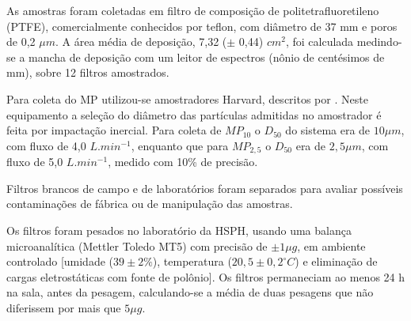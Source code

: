 As amostras foram coletadas em filtro de composição de politetrafluoretileno
(PTFE), comercialmente conhecidos por teflon, com diâmetro de 37 mm e 
poros de 0,2 $\mu m$. A área média de deposição, 7,32 ($\pm$ 0,44) $cm^2$, 
foi calculada medindo-se a mancha de deposição com um leitor de espectros 
(nônio de centésimos de mm), sobre 12 filtros amostrados.

Para coleta do MP utilizou-se amostradores Harvard, descritos por 
\citet{marple1987}. Neste equipamento a seleção do diâmetro das partículas 
admitidas no amostrador é feita por impactação inercial. 
Para coleta de $MP_{10}$ o $D_{50}$ do sistema era de $10 \mu m$, 
com fluxo de 4,0 $L.min^{-1}$, enquanto que para $MP_{2,5}$ o $D_{50}$ 
era de $2,5 \mu m$, com fluxo de 5,0 $L.min^{-1}$, medido com 10\% de precisão. 

Filtros brancos de campo e de laboratórios foram separados para avaliar 
possíveis contaminações de fábrica ou de manipulação das amostras. 

Os filtros foram pesados no laboratório da HSPH, usando uma balança
microanalítica (Mettler Toledo MT5) com precisão de $\pm 1 \mu g$, 
em ambiente controlado [umidade ($39 \pm 2 \%$), 
temperatura ($20,5 \pm 0,2 ^{\circ} C$) e eliminação de cargas eletrostáticas 
com fonte de polônio]. Os filtros permaneciam ao menos 24 h na sala, 
antes da pesagem, calculando-se a média de duas pesagens que não diferissem 
por mais que $5 \mu g$.
